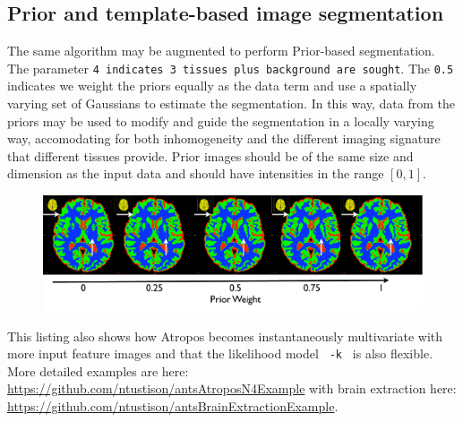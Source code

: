 \documentclass{InsightArticle}
\begin{document}
\subsection{Prior and template-based image segmentation}
The same algorithm may be augmented 
to perform Prior-based segmentation.  
The parameter \texttt{4 indicates 3 tissues plus background are sought}.  The \texttt{0.5} indicates 
we weight the priors equally as the data term and use a spatially varying set of Gaussians 
to estimate the segmentation.  In this way, data from the priors may be used to modify 
and guide the segmentation in a locally varying way, accomodating for both inhomogeneity 
and the different imaging signature that different tissues provide.   Prior images should be 
of the same size and dimension as the input data and should have intensities in the range $[0,1]$.
\begin{figure}
\includegraphics[width=1\textwidth]{Figures/segmentation2.pdf}
\label{fig:seg2}
\end{figure}
This listing also shows how Atropos becomes instantaneously
multivariate with more input feature images and that the likelihood
model \texttt{ -k } is also flexible.
More detailed examples are here:
\href{https://github.com/ntustison/antsAtroposN4Example}{https://github.com/ntustison/antsAtroposN4Example}
with brain extraction here: \href{https://github.com/ntustison/antsBrainExtractionExample}{https://github.com/ntustison/antsBrainExtractionExample}.
\end{document}
